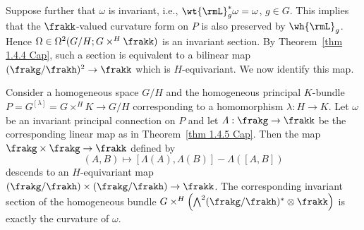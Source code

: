 Suppose further that $\omega$ is invariant, i.e., $\wt{\rmL}_g^\ast \omega=\omega$, $g\in G$. This implies that the $\frakk$-valued curvature form on $P$ is also preserved by $\wh{\rmL}_g$. Hence $\Omega\in\Omega^2(G\slash H;G\times^H \frakk)$ is an invariant section. By Theorem~\ref{thm 1.4.4 Cap}, such a section is equivalent to a bilinear map $(\frakg\slash\frakh)^2\to\frakk$ which is $H$-equivariant. We now identify this map.
\begin{prop}\label{prop 1.4.6 Cap}
    Consider a homogeneous space $G\slash H$ and the homogeneous principal $K$-bundle $P=G^{[\lambda]}=G\times^H K\to G\slash H$ corresponding to a homomorphism $\lambda:H\to K$. Let $\omega$ be an invariant principal connection on $P$ and let $\varLambda:\frakg\to \frakk$ be the corresponding linear map as in Theorem~\ref{thm 1.4.5 Cap}. Then the map $\frakg\times\frakg\to\frakk$ defined by 
    \[(A,B)\mapsto [\varLambda(A),\varLambda(B)]-\varLambda([A,B])\]
    descends to an $H$-equivariant map $(\frakg\slash\frakh)\times(\frakg\slash\frakh)\to \frakk$. The corresponding invariant section of the homogeneous bundle $G\times^H \left(\bigwedge\nolimits^2(\frakg\slash\frakh)^\ast\otimes\frakk\right)$ is exactly the curvature of $\omega$.
\end{prop}

